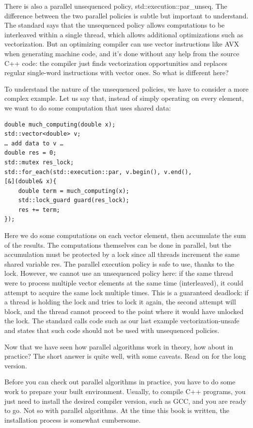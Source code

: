 There is also a parallel unsequenced policy, std::execution::par\_unseq. The difference between the two parallel policies is subtle but important to understand. The standard says that the unsequenced policy allows computations to be interleaved within a single thread, which allows additional optimizations such as vectorization. But an optimizing compiler can use vector instructions like AVX when generating machine code, and it's done without any help from the source C++ code: the compiler just finds vectorization opportunities and replaces regular single-word instructions with vector ones. So what is different here?

To understand the nature of the unsequenced policies, we have to consider a more complex example. Let us say that, instead of simply operating on every element, we want to do some computation that uses shared data:

\begin{lstlisting}[style=styleCXX]
double much_computing(double x);
std::vector<double> v;
… add data to v … 
double res = 0;
std::mutex res_lock;
std::for_each(std::execution::par, v.begin(), v.end(),
[&](double& x){ 
	double term = much_computing(x);
	std::lock_guard guard(res_lock);
	res += term;
});
\end{lstlisting}

Here we do some computations on each vector element, then accumulate the sum of the results. The computations themselves can be done in parallel, but the accumulation must be protected by a lock since all threads increment the same shared variable res. The parallel execution policy is safe to use, thanks to the lock. However, we cannot use an unsequenced policy here: if the same thread were to process multiple vector elements at the same time (interleaved), it could attempt to acquire the same lock multiple times. This is a guaranteed deadlock: if a thread is holding the lock and tries to lock it again, the second attempt will block, and the thread cannot proceed to the point where it would have unlocked the lock. The standard calls code such as our last example vectorization-unsafe and states that such code should not be used with unsequenced policies. 

Now that we have seen how parallel algorithms work in theory, how about in practice? The short answer is quite well, with some caveats. Read on for the long version.

Before you can check out parallel algorithms in practice, you have to do some work to prepare your built environment. Usually, to compile C++ programs, you just need to install the desired compiler version, such as GCC, and you are ready to go. Not so with parallel algorithms. At the time this book is written, the installation process is somewhat cumbersome. 

